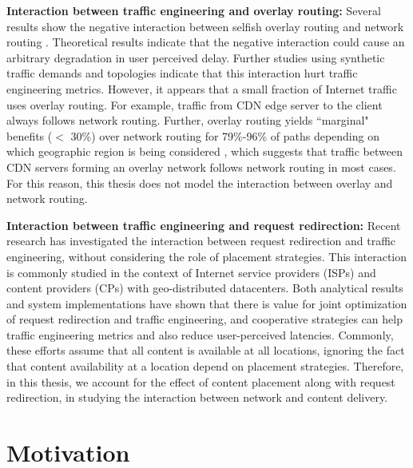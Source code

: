 \textbf{Interaction between traffic engineering and overlay routing:} Several results show the negative interaction between selfish overlay routing and network routing \cite{Roughgarden,selfishQiu}. Theoretical results indicate that the negative interaction could cause an arbitrary degradation in user perceived delay. Further studies using synthetic traffic demands and topologies indicate that this interaction hurt traffic engineering metrics. However, it appears that a small fraction of Internet traffic uses overlay routing.  For example, traffic from CDN edge server to the client always follows network routing. Further, overlay routing yields ``marginal" benefits ($<$ 30\%) over network routing for 79\%-96\% of paths depending on which geographic region is being considered  \cite{rahul2006overlays}, which suggests that traffic between CDN servers forming an overlay network follows network routing in most cases. For this reason, this thesis does not model the interaction between overlay and network routing.

\textbf{Interaction between traffic engineering and request redirection:} Recent research has investigated the interaction between request redirection and traffic engineering, without considering the role of placement strategies. This interaction is commonly studied in the context of Internet service providers (ISPs) and content providers (CPs) with geo-distributed datacenters. 
Both analytical results \cite{Jiang2009,JohariGameTheory} and system implementations \cite{CATE,P4P} have shown that there is value for joint optimization of request redirection and traffic engineering, and cooperative strategies can help traffic engineering metrics and also reduce user-perceived latencies. Commonly, these efforts assume that all content is available at all locations, ignoring the fact that content availability at a location depend on placement strategies. Therefore, in this thesis, we account for the effect of content placement along with request redirection, in studying the interaction between network and content delivery.


\section{Motivation}
\label{sec:bg-motivation}

